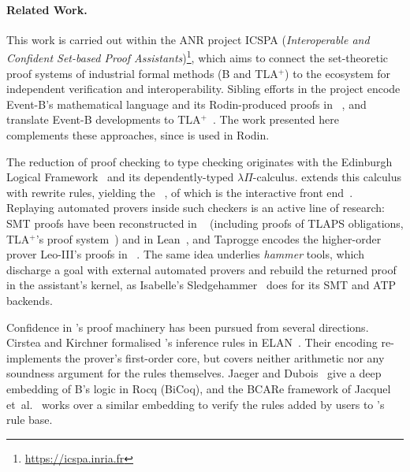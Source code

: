 \paragraph{Related Work.}
This work is carried out within the ANR project ICSPA (\emph{Interoperable
and Confident Set-based Proof Assistants})\footnote{\url{https://icspa.inria.fr}},
which aims to connect the set-theoretic proof systems of industrial formal
methods (B and TLA$^+$) to the \dedukti{} ecosystem for independent verification
and interoperability.
%
Sibling efforts in the project encode Event-B's mathematical language
and its Rodin-produced proofs in \lp~\cite{grieu2024eventb,
grieu2025jfla}, and translate Event-B developments to
TLA$^+$~\cite{grieu2025eventbtla}.
The work presented here complements these approaches, since \pp{} is
used in Rodin.

The reduction of proof checking to type checking originates with the
Edinburgh Logical Framework~\cite{harper1993lf} and its dependently-typed
$\lambda\Pi$-calculus.
%
\dedukti{} extends this calculus with rewrite rules,
yielding the \lpcmr~\cite{CousineauDowek, assaf2023dedukti}, of which \lp{} is
the interactive front end~\cite{hondet:hal-02981561}.
Replaying automated provers inside such checkers is an active line of research:
SMT proofs have been reconstructed in \lp~\cite{coltellacci2026acta}
(including proofs of TLAPS obligations, TLA$^+$'s proof system~\cite{coltellacci2023abz})
and in Lean~\cite{mohamed25leansmt}, and Taprogge encodes the higher-order
prover Leo-III's proofs in \dedukti~\cite{taprogge2024leo3}.
%
The same idea underlies \emph{hammer} tools, which discharge a goal with
external automated provers and rebuild the returned proof in the assistant's
kernel, as Isabelle's Sledgehammer~\cite{sledgehammer} does for its SMT and
ATP backends.

Confidence in \ab's proof machinery has been pursued from several
directions.
%
Cirstea and Kirchner formalised \pp's inference rules in ELAN~\cite{cirstea1998elan}.
Their encoding re-implements the prover's first-order core, but covers
neither arithmetic nor any soundness argument for the rules themselves.
%
Jaeger and Dubois~\cite{jaeger2007trustb} give a deep embedding of B's logic
in Rocq (BiCoq), and the BCARe framework of Jacquel et~al.~\cite{jacquel2011bcare, jacquel2015sosym}
works over a similar embedding to verify the rules added by users
to \ab's rule base.

